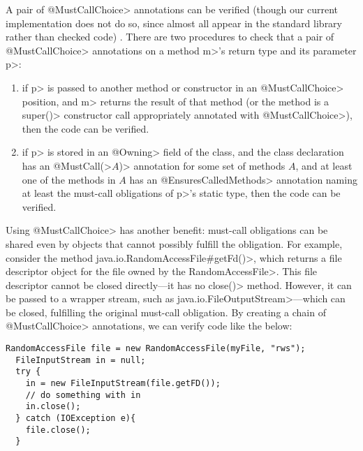 A pair of \<@MustCallChoice> annotations can be verified (though our current
implementation does not do so, since almost all appear in the standard
library rather than checked code) . There are two
procedures to check
that a pair of \<@MustCallChoice> annotations on a method \<m>'s return type
and its parameter \<p>:
\begin{enumerate}
\item if \<p> is passed to another method or constructor in an
  \<@MustCallChoice> position, and \<m> returns the result of that method
  (or the method is a \<super()> constructor call appropriately annotated
  with \<@MustCallChoice>), then the code can be verified.
\item if \<p> is stored in an \<@Owning> field of the class, and the
  class declaration has an \<@MustCall(>$A$\<)> annotation for some set
  of methods $A$, and at least one of the methods in $A$ has an
  \<@EnsuresCalledMethods> annotation naming at least the
  must-call obligations of \<p>'s static type, then the code can be verified.
\end{enumerate}

Using \<@MustCallChoice> has another benefit: must-call obligations
can be shared even by objects that cannot possibly fulfill the
obligation. For example, consider the method
\<java.io.RandomAccessFile\#getFd()>, which returns a file descriptor
object for the file owned by the \<RandomAccessFile>. This file
descriptor cannot be closed directly---it has no \<close()> method.
However, it can be passed to a wrapper stream, such as
\<java.io.FileOutputStream>---which can be closed, fulfilling
the original must-call obligation. By creating a chain of \<@MustCallChoice>
annotations, we can verify code like the below:

\begin{lstlisting}[frame=tb,belowskip=3mm]
  RandomAccessFile file = new RandomAccessFile(myFile, "rws");
  FileInputStream in = null;
  try {
    in = new FileInputStream(file.getFD());
    // do something with in  
    in.close();
  } catch (IOException e){
    file.close();
  }
\end{lstlisting}
